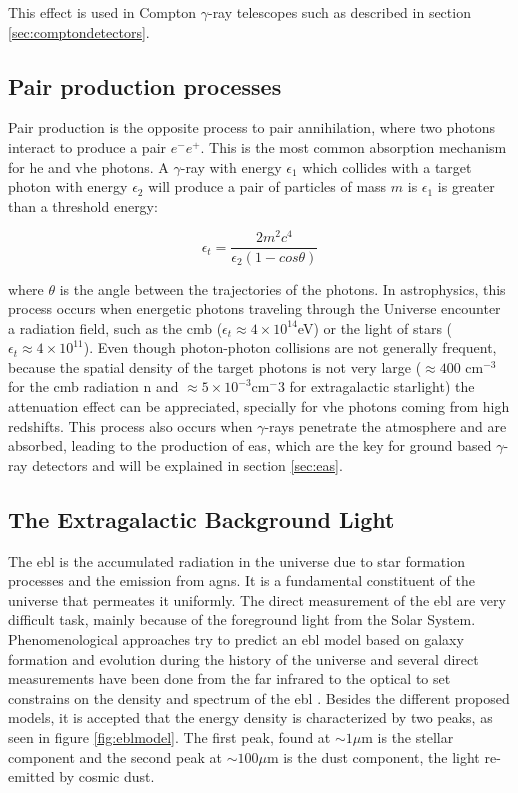 \documentclass[main.tex]{subfiles}
\begin{document}
This effect is used in Compton $\gamma$-ray telescopes such as described in section \ref{sec:comptondetectors}. 

\subsection{Pair production processes}

Pair production is the opposite process to pair annihilation, where two photons interact to produce a pair $e^{-}e^{+}$. This is the most common absorption mechanism for \gls{he} and \gls{vhe} photons.
A $\gamma$-ray with energy $\epsilon_1$ which collides with a target photon with energy $\epsilon_2$ will produce a pair of particles of mass $m$ is $\epsilon_1$ is greater than a threshold energy:

\begin{equation}
    \epsilon_t = \frac{2m^2c^4}{\epsilon_2(1-cos\theta)}
\end{equation}

where $\theta$ is the angle between the trajectories of the photons. In astrophysics, this process occurs when energetic photons traveling through the Universe encounter a radiation field, such as the \gls{cmb} ($\epsilon_t \approx 4\times10^{14}$eV) or the light of stars ($\epsilon_t \approx 4\times10^{11}$). Even though photon-photon collisions are not generally frequent, because the spatial density of the target photons is not very large ($\approx 400$ cm$^{-3}$ for the \gls{cmb} radiation n and $\approx 5\times10^{-3}$cm$^-3$ for extragalactic starlight) the attenuation effect can be appreciated, specially for \gls{vhe} photons coming from high redshifts. 
This process also occurs when $\gamma$-rays penetrate the atmosphere and are absorbed, leading to the production of \gls{eas}, which are the key for ground based $\gamma$-ray detectors and will be explained in section \ref{sec:eas}.


\subsection{The Extragalactic Background Light}

The \gls{ebl} is the accumulated radiation in the universe due to star formation processes and the emission from \glspl{agn}. It is a fundamental constituent of the universe that permeates it uniformly. The direct measurement of the \gls{ebl} are very difficult task, mainly because of the foreground light from the Solar System.  Phenomenological approaches try to predict an \gls{ebl} model based on galaxy formation and evolution during the history of the universe and several direct measurements have been done from the far infrared to the optical to set constrains on the density and spectrum of the \gls{ebl} \cite{DominguezEBL}. Besides the different proposed models, it is accepted that the energy density is characterized by two peaks, as seen in figure \ref{fig:eblmodel}. The first peak, found at $\sim 1\mu$m is the stellar component and the second peak at $\sim 100 \mu $m is the dust component, the light re-emitted by cosmic dust. 
\end{document}
